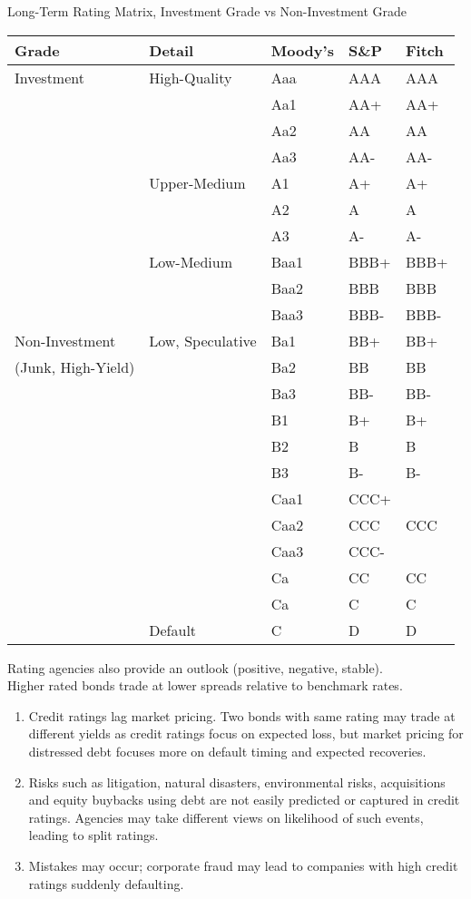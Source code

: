 \begin{flushleft}
Long-Term Rating Matrix, Investment Grade vs Non-Investment Grade
\begin{tabularx}{\textwidth}{p{9em}|p{8em}|X|X|X}
\hline
\rowcolor{gray!30}
Grade & Detail & Moody's & S\&P & Fitch \\
\hline
Investment & High-Quality & Aaa & AAA & AAA \\
& & Aa1 & AA+ & AA+ \\
& & Aa2 & AA & AA \\
& & Aa3 & AA- & AA- \\
& Upper-Medium & A1 & A+ & A+ \\
& & A2 & A & A \\
& & A3 & A- & A- \\
& Low-Medium & Baa1 & BBB+ & BBB+ \\
& & Baa2 & BBB & BBB \\
& & Baa3 & BBB- & BBB- \\
\hline
Non-Investment & Low, Speculative & Ba1 & BB+ & BB+ \\
(Junk, High-Yield) & & Ba2 & BB & BB \\
& & Ba3 & BB- & BB- \\
& & B1 & B+ & B+ \\
& & B2 & B & B \\
& & B3 & B- & B- \\
& & Caa1 & CCC+ & \\
& & Caa2 & CCC & CCC \\
& & Caa3 & CCC- & \\
& & Ca & CC & CC \\
& & Ca & C & C \\
& Default & C & D & D \\
\hline
\end{tabularx}
\end{flushleft}
Rating agencies also provide an outlook (positive, negative, stable).\\
Higher rated bonds trade at lower spreads relative to benchmark rates.

\begin{remark} 
\begin{enumerate}[label=\roman*.]
\setlength{\itemsep}{0pt}
\item Credit ratings lag market pricing. Two bonds with same rating may trade at different yields as credit ratings focus on expected loss, but market pricing for distressed debt focuses more on default timing and expected recoveries.
\item Risks such as litigation, natural disasters, environmental risks, acquisitions and equity buybacks using debt are not easily predicted or captured in credit ratings. Agencies may take different views on likelihood of such events, leading to split ratings.
\item Mistakes may occur; corporate fraud may lead to companies with high credit ratings suddenly defaulting.
\end{enumerate}
\end{remark}


